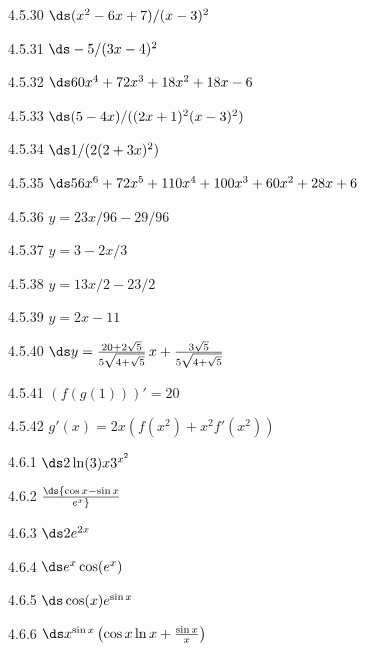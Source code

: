\begin{Answer}{4.5.30}
$\ds (x^2-6x+7)/(x-3)^2$
\end{Answer}
\begin{Answer}{4.5.31}
$\ds -5/(3x-4)^2$
\end{Answer}
\begin{Answer}{4.5.32}
$\ds 60x^4+72x^3+18x^2+18x-6$
\end{Answer}
\begin{Answer}{4.5.33}
$\ds (5-4x)/((2x+1)^2(x-3)^2)$
\end{Answer}
\begin{Answer}{4.5.34}
$\ds 1/(2(2+3x)^2)$
\end{Answer}
\begin{Answer}{4.5.35}
$\ds 56x^6+72x^5+110x^4+100x^3+60x^2+28x+6$
\end{Answer}
\begin{Answer}{4.5.36}
$y=23x/96-29/96$
\end{Answer}
\begin{Answer}{4.5.37}
$y=3-2x/3$
\end{Answer}
\begin{Answer}{4.5.38}
$y=13x/2-23/2$
\end{Answer}
\begin{Answer}{4.5.39}
$y=2x-11$
\end{Answer}
\begin{Answer}{4.5.40}
$\ds y={20+2\sqrt5\over5\sqrt{4+\sqrt5}}\,x+{3\sqrt5\over5\sqrt{4+\sqrt5}}$
\end{Answer}
\begin{Answer}{4.5.41}
	$(f(g(1)))'=20$
\end{Answer}
\begin{Answer}{4.5.42}
	$g'(x)=2x(f(x^2)+x^2f'(x^2))$
\end{Answer}
\begin{Answer}{4.6.1}
	$\ds 2\ln(3)x3^{x^2}$
\end{Answer}
\begin{Answer}{4.6.2}
	$\ds {\cos x-\sin x \over e^x}$
\end{Answer}
\begin{Answer}{4.6.3}
	$\ds 2e^{2x}$
\end{Answer}
\begin{Answer}{4.6.4}
	$\ds e^x\cos(e^x)$
\end{Answer}
\begin{Answer}{4.6.5}
	$\ds  \cos (x) e^{\sin x}$
\end{Answer}
\begin{Answer}{4.6.6}
	$\ds x^{\sin x}\left(\cos x\ln x+{\sin x\over x}\right)$
\end{Answer}
